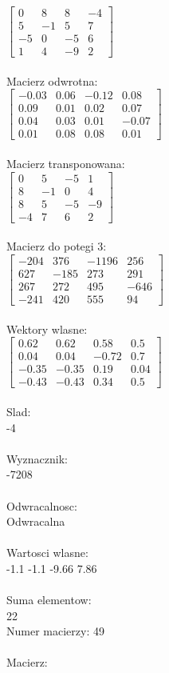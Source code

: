 \documentclass[a4paper,12pt]{article}
\begin{document}
$\begin{bmatrix} 0&8&8&-4\\5&-1&5&7\\-5&0&-5&6\\1&4&-9&2 \end{bmatrix}$
\\
\\
Macierz odwrotna:\\

$\begin{bmatrix} -0.03&0.06&-0.12&0.08\\0.09&0.01&0.02&0.07\\0.04&0.03&0.01&-0.07\\0.01&0.08&0.08&0.01 \end{bmatrix}$
\\
\\
Macierz transponowana:\\

$\begin{bmatrix} 0&5&-5&1\\8&-1&0&4\\8&5&-5&-9\\-4&7&6&2 \end{bmatrix}$
\\
\\
Macierz do potegi 3:\\

$\begin{bmatrix} -204&376&-1196&256\\627&-185&273&291\\267&272&495&-646\\-241&420&555&94 \end{bmatrix}$
\\
\\
Wektory wlasne:\\

$\begin{bmatrix} 0.62&0.62&0.58&0.5\\0.04&0.04&-0.72&0.7\\-0.35&-0.35&0.19&0.04\\-0.43&-0.43&0.34&0.5 \end{bmatrix}$
\\
\\
Slad:\\
-4
\\
\\
Wyznacznik:\\
-7208
\\
\\
Odwracalnosc:\\
Odwracalna
\\
\\
Wartosci wlasne:\\
-1.1 -1.1 -9.66 7.86
\\
\\
Suma elementow:\\
22
\\
\newpage
Numer macierzy:
49
\\
\\
Macierz:\\
\end{document}
